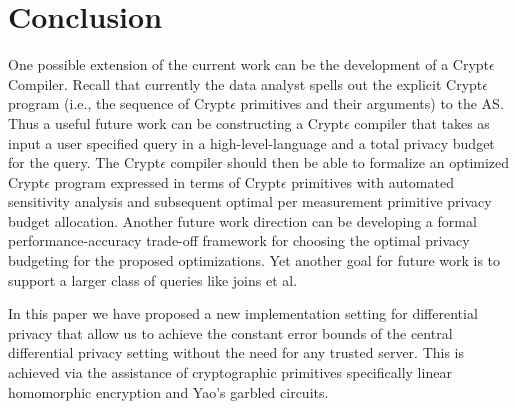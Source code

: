 \section{Conclusion}
One possible extension of the current work can be the development of a
Crypt$\epsilon$ Compiler. Recall that currently the data analyst spells out the explicit Crypt$\epsilon$ program  (i.e., the sequence of Crypt$\epsilon$ primitives and their arguments) to the \textsf{AS}. Thus a useful future work can be constructing a Crypt$\epsilon$ compiler that takes as input a user specified query in a high-level-language and a total privacy budget for the query. The Crypt$\epsilon$
compiler should then be able to formalize an optimized Crypt$\epsilon$ program expressed in terms of Crypt$\epsilon$ primitives with automated sensitivity analysis and subsequent optimal per measurement primitive privacy budget allocation. 
Another future work direction can be developing a formal performance-accuracy trade-off framework for choosing the optimal privacy budgeting for the proposed optimizations. Yet another goal for future work is to support a larger class of queries like joins et al.
\par In this paper we have proposed a new implementation setting for differential privacy that allow us to achieve the constant error bounds of the central differential privacy setting without the need for any trusted server. This is achieved via the assistance of cryptographic primitives specifically linear homomorphic encryption and Yao's garbled circuits. 